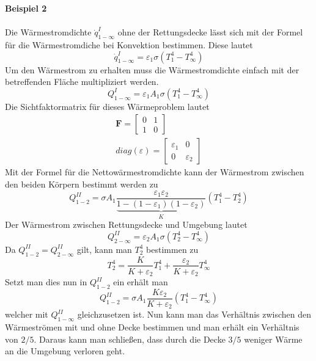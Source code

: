 \textbf{Beispiel 2} \\ \\
Die Wärmestromdichte $\dot{q}_{1-\infty}^I$ ohne der Rettungsdecke lässt sich mit der Formel für die Wärmestromdiche bei Konvektion bestimmen. Diese lautet
\[
	\dot{q}_{1-\infty}^I = \varepsilon_1\sigma(T_1^4 - T_\infty^4)
\]
Um den Wärmestrom zu erhalten muss die Wärmestromdichte einfach mit der betreffenden Fläche multipliziert werden.
\[
	Q_{1-\infty}^I = \varepsilon_1A_1\sigma(T_1^4 - T_\infty^4)
\]
Die Sichtfaktormatrix für dieses Wärmeproblem lautet
\begin{align*}
	\textbf{F} = \begin{bmatrix}
		0 & 1 \\
		1 & 0	
	\end{bmatrix}
	\\
	diag(\varepsilon) = \begin{bmatrix}
		\varepsilon_1 & 0 \\
		0 & \varepsilon_2
	\end{bmatrix}
\end{align*}
Mit der Formel für die Nettowärmestromdichte kann der Wärmestrom zwischen den beiden Körpern bestimmt werden zu
\[
	Q_{1-2}^{II} = \sigma A_1 \frac{\varepsilon_1 \varepsilon_2}{\underbrace{1 - (1 - \varepsilon_1)(1 - \varepsilon_2)}_{K}}(T_1^4 - T_2^4 )
\]
Der Wärmestrom zwischen Rettungsdecke und Umgebung lautet
\[
	Q_{2-\infty}^{II} = \varepsilon_2 A_1\sigma(T_2^4 - T_\infty^4)
\]
Da $Q_{1-2}^{II} = Q_{2-\infty}^{II}$ gilt, kann man $T_2^4$ bestimmen zu
\[
	T_2^4 = \frac{K}{K + \varepsilon_2}T_1^4 + \frac{\varepsilon_2}{K + \varepsilon_2}T_\infty^4
\]
Setzt man dies nun in $Q_{1-2}^{II}$ ein erhält man
\[
	Q_{1-2}^{II} = \sigma A_1 \frac{K\varepsilon_2}{K + \varepsilon_2}(T_1^4 - T_\infty^4)
\]
welcher mit $Q_{1-\infty}^{II}$ gleichzusetzen ist.
Nun kann man das Verhältnis zwischen den Wärmeströmen mit und ohne Decke bestimmen und man erhält ein Verhältnis von $2/5$. Daraus kann man schließen, dass durch die Decke $3/5$ weniger Wärme an die Umgebung verloren geht.